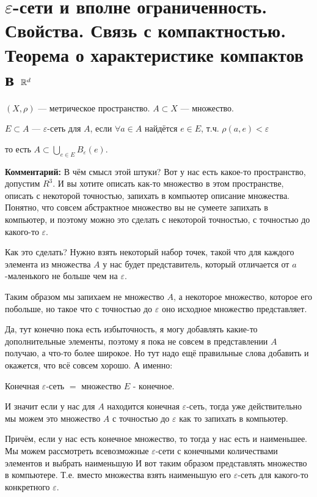 \section{$\varepsilon$-сети и вполне ограниченность. Свойства. Связь с компактностью. Теорема о характеристике компактов в $\mathbb{R}^d$}

\begin{conj}
    $(X, \rho)$ --- метрическое пространство. $A \subset X$ --- множество.

    $E \subset A$ --- $\varepsilon$-сеть для $A$, если $\forall a \in A$ найдётся $e \in E$, т.ч. $\rho(a, e) < \varepsilon$

    то есть $A \subset \bigcup\limits_{e \in E} B_{\varepsilon}(e)$.

\end{conj}

\textbf{Комментарий:}
В чём смысл этой штуки?
Вот у нас есть какое-то пространство, допустим $R^3$.
И вы хотите описать как-то множество в этом пространстве,
описать с некоторой точностью, запихать в компьютер описание множества.
Понятно, что совсем абстрактное множество вы не сумеете запихать в компьютер,
и поэтому можно это сделать с некоторой точностью,
с точностью до какого-то $\varepsilon$. 

Как это сделать? Нужно взять некоторый набор точек,
такой что для каждого элемента из множества $A$ у нас будет представитель, который
отличается от $a$-маленького не больше чем на $\varepsilon$.

Таким образом мы запихаем не множество $A$, а некоторое множество, которое его побольше, но такое что с точностью до
$\varepsilon$ оно исходное множество представляет.

Да, тут конечно пока есть избыточность, я могу добавлять какие-то дополнительные элементы, поэтому я пока не совсем в представлении $A$ получаю, а что-то более широкое.
Но тут надо ещё правильные слова добавить и окажется, что всё совсем хорошо.
А именно:

\begin{conj}
    Конечная $\varepsilon$-сеть $=$ множество $E$ - конечное. 
\end{conj}

И значит если у нас для $A$ находится конечная $\varepsilon$-сеть, тогда уже действительно мы можем это множество $A$ с точностью до $\varepsilon$ как то запихать в компьютер.

Причём, если у нас есть конечное множество, то тогда у нас есть и наименьшее.
Мы можем рассмотреть всевозможные $\varepsilon$-сети с конечными количествами элементов и выбрать наименьшую
И вот таким образом представлять множество в компьютере. Т.е. вместо множества взять наименьшую его $\varepsilon$-сеть для какого-то конкретного $\varepsilon$.

